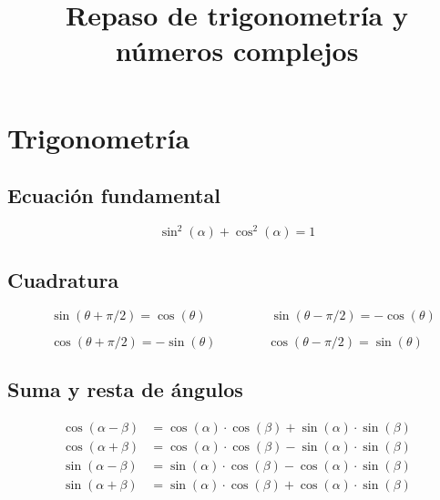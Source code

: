 \documentclass[article, a4paper]{memoir}
\author{}
\date{}
\title{\vspace{-20mm}

Repaso de trigonometría y números complejos \vspace{-18mm}}
\begin{document}
\maketitle

\section{Trigonometría}

\subsection{Ecuación fundamental}

\vspace{-5mm}
\begin{equation*}
  \sin^2(\alpha) + \cos^2(\alpha) = 1
\end{equation*}

\vspace{-5mm}
\subsection{Cuadratura}

\vspace{-7mm}
\begin{equation*}
  \quad \sin(\theta + \pi/2) = \cos(\theta) \qquad\qquad\quad \sin(\theta - \pi/2) = -\cos(\theta)
\end{equation*}  

\vspace{-5mm}
\begin{equation*}
  \cos(\theta + \pi/2) = -\sin(\theta) \qquad\qquad \cos(\theta - \pi/2) = \sin(\theta)
\end{equation*}

\vspace{-3mm}
\subsection{Suma y resta de ángulos}

\vspace{-9mm}
\begin{align*}
  \cos(\alpha - \beta) &= \cos(\alpha) \cdot \cos(\beta) + \sin(\alpha) \cdot \sin(\beta)\\
  \cos(\alpha + \beta) &= \cos(\alpha) \cdot \cos(\beta) - \sin(\alpha) \cdot \sin(\beta)\\
  \sin(\alpha - \beta) &= \sin(\alpha) \cdot \cos(\beta) - \cos(\alpha) \cdot \sin(\beta)\\
  \sin(\alpha + \beta) &= \sin(\alpha) \cdot \cos(\beta) + \cos(\alpha) \cdot \sin(\beta)
\end{align*}
\end{document}
